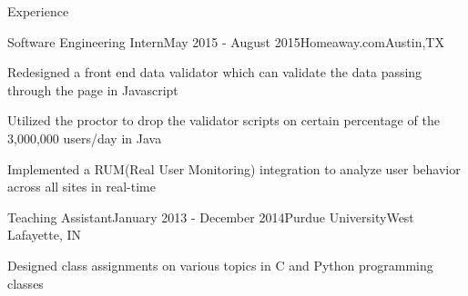 \documentclass{resume} %
\begin{document}
\begin{rSection}{Experience}

\begin{rSubsection}{Software Engineering Intern}{May 2015 - August 2015}{Homeaway.com}{Austin,TX}
\item Redesigned a front end data validator which can validate the data passing through the page in Javascript
\item Utilized the proctor to drop the validator scripts on certain percentage of the 3,000,000 users/day in Java
\item Implemented a RUM(Real User Monitoring) integration to analyze user behavior across all sites in real-time  
\end{rSubsection}

\begin{rSubsection}{Teaching Assistant}{January 2013 - December 2014}{Purdue University}{West Lafayette, IN}
\item Designed class assignments on various topics in C and Python programming classes
\end{rSubsection}


\end{rSection}


\end{document}
